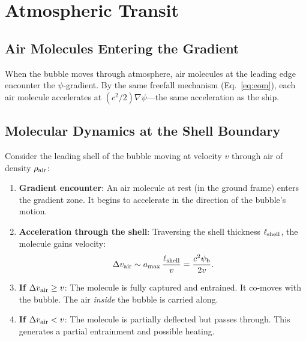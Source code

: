 \documentclass[12pt,aps,prd,superscriptaddress,nofootinbib]{revtex4-2}
\newcommand{\psib}{\psi_{\rm b}}
\newcommand{\Lshell}{\ell_{\rm shell}}
\begin{document}
\section{Atmospheric Transit}\label{sec:atmosphere}

\subsection{Air Molecules Entering the Gradient}

When the bubble moves through atmosphere, air molecules at the
leading edge encounter the $\psi$-gradient. By the same freefall
mechanism (Eq.~\ref{eq:eom}), each air molecule accelerates at
$(c^2/2)\nabla\psi$---the same acceleration as the ship.

\subsection{Molecular Dynamics at the Shell Boundary}

Consider the leading shell of the bubble moving at velocity $v$
through air of density $\rho_{\rm air}$:

\begin{enumerate}
\item \textbf{Gradient encounter}: An air molecule at rest (in the
ground frame) enters the gradient zone. It begins to accelerate
in the direction of the bubble's motion.

\item \textbf{Acceleration through the shell}: Traversing the shell
thickness $\Lshell$, the molecule gains velocity:
\begin{equation}
\Delta v_{\rm air} \sim a_{\rm max}\,\frac{\Lshell}{v}
= \frac{c^2\psib}{2v}.
\end{equation}

\item \textbf{If $\Delta v_{\rm air} \geq v$}: The molecule is fully
captured and entrained. It co-moves with the bubble. The air
\emph{inside} the bubble is carried along.

\item \textbf{If $\Delta v_{\rm air} < v$}: The molecule is partially
deflected but passes through. This generates a partial
entrainment and possible heating.
\end{enumerate}
\end{document}
